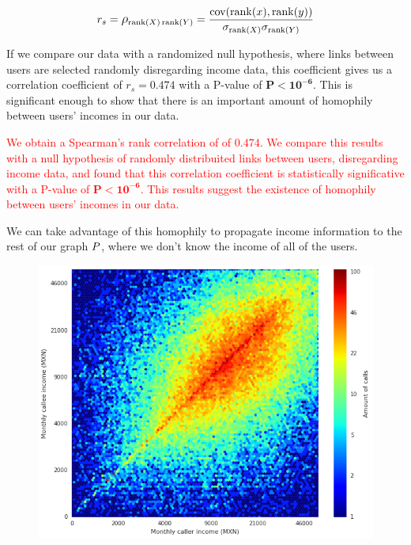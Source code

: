 \[
r_s = \mathlarger{\rho}_{\operatorname{rank}(X) \operatorname{rank}(Y)} = \frac{\operatorname{cov}(\operatorname{rank}(x), \operatorname{rank}(y))}{\sigma_{\operatorname{rank}(X)} \sigma_{\operatorname{rank}(Y)}}
\]

If we compare our data with a randomized null hypothesis, where links between users are selected randomly disregarding income data, this coefficient gives us a correlation coefficient of $r_s = \mathbf{0.474} $ with a P-value of $ \mathbf{P < 10^{-6}} $. This is significant enough to show that there is an important amount of homophily between users' incomes in our data.

\textcolor{red}{
 We obtain a Spearman's rank correlation of of $ \mathbf{0.474} $. We compare this results with a null hypothesis of randomly distribuited links between users, disregarding income data, and found that this correlation coefficient is statistically significative with a P-value of $ \mathbf{P < 10^{-6}} $. This results suggest the existence of homophily between users' incomes in our data.
}

We can take advantage of this homophily to propagate income information to the rest of our graph $ \mathlarger{P} $, where we don't know the income of all of the users.

\begin{figure}[h]
\begin{center}
\includegraphics[width=1\columnwidth]{figures/Homophily_income_origin_target_1/Homophily_income_origin_target_1.png}
\caption{ \protect}
\label{homophily_heatmap}
\end{center}
\end{figure}

